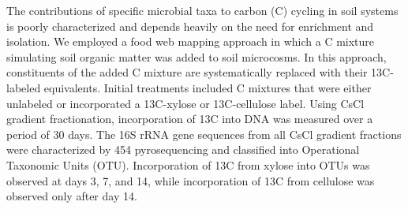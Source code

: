 The contributions of specific microbial taxa to carbon (C) cycling in soil systems is poorly characterized and depends heavily on the need for enrichment and isolation. We employed a food web mapping approach in which a C mixture simulating soil organic matter was added to soil microcosms. In this approach, constituents of the added C mixture are systematically replaced with their 13C-labeled equivalents. Initial treatments included C mixtures that were either unlabeled or incorporated a 13C-xylose or 13C-cellulose label. Using CsCl gradient fractionation, incorporation of 13C into DNA was measured over a period of 30 days. The 16S rRNA gene sequences from all CsCl gradient fractions were characterized by 454 pyrosequencing and classified into Operational Taxonomic Units (OTU). Incorporation of 13C from xylose into OTUs was observed at days 3, 7, and 14, while incorporation of 13C from cellulose was observed only after day 14.